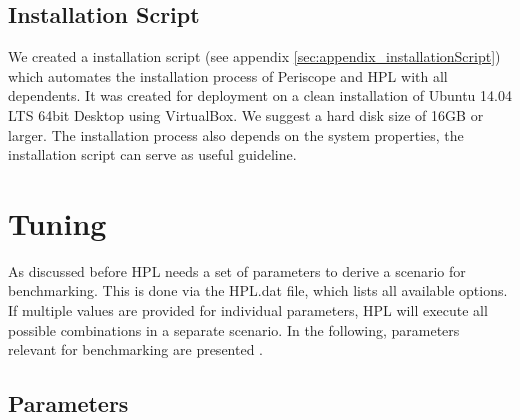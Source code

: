 \documentclass[10pt,twocolumn]{article}
\begin{document}
\subsection{Installation Script}
We created a installation script (see appendix \ref{sec:appendix_installationScript}) which automates the installation process of Periscope and HPL with all dependents. It was created for deployment on a clean installation of Ubuntu 14.04 LTS 64bit Desktop using VirtualBox. We suggest a hard disk size of 16GB or larger. The installation process also depends on the system properties, the installation script can serve as useful guideline.


\section{Tuning}
\label{sec:tuning}

As discussed before HPL needs a set of parameters to derive a scenario for benchmarking. This is done via the HPL.dat file, which lists all available options. If multiple values are provided for individual parameters, HPL will execute all possible combinations in a separate scenario. In the following, parameters relevant for benchmarking are presented \cite{HPLtuning, HPLexplained}.

\subsection{Parameters}
\label{sec:tuning_parameters}
\end{document}
